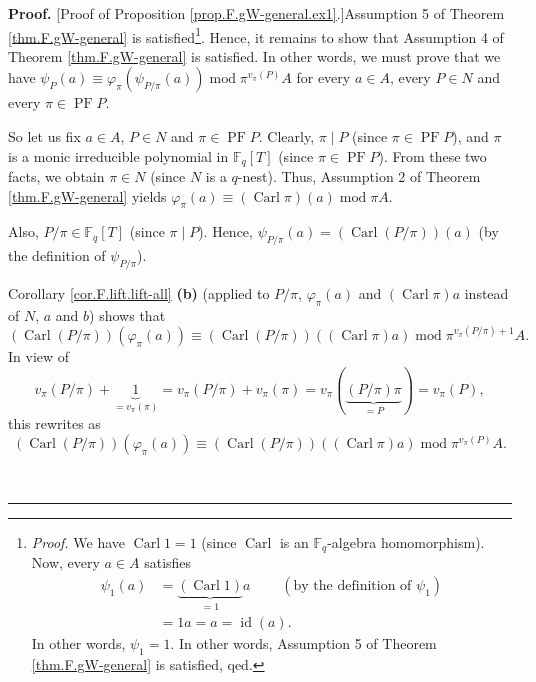 \documentclass[numbers=enddot,12pt,final,onecolumn,notitlepage]{scrartcl}%
\theoremstyle{definition}
\newenvironment{proof}[1][Proof]{\noindent\textbf{#1.} }{\ \rule{0.5em}{0.5em}}
\begin{document}
\begin{proof}
[Proof of Proposition \ref{prop.F.gW-general.ex1}.]Assumption 5 of Theorem
\ref{thm.F.gW-general} is satisfied\footnote{\textit{Proof.} We have
$\operatorname*{Carl}1=1$ (since $\operatorname*{Carl}$ is an $\mathbb{F}_{q}%
$-algebra homomorphism). Now, every $a\in A$ satisfies
\begin{align*}
\psi_{1}\left(  a\right)   &  =\underbrace{\left(  \operatorname*{Carl}%
1\right)  }_{=1}a\ \ \ \ \ \ \ \ \ \ \left(  \text{by the definition of }%
\psi_{1}\right) \\
&  =1a=a=\operatorname*{id}\left(  a\right)  .
\end{align*}
In other words, $\psi_{1}=1$. In other words, Assumption 5 of Theorem
\ref{thm.F.gW-general} is satisfied, qed.}. Hence, it remains to show that
Assumption 4 of Theorem \ref{thm.F.gW-general} is satisfied. In other words,
we must prove that we have $\psi_{P}\left(  a\right)  \equiv\varphi_{\pi
}\left(  \psi_{P/\pi}\left(  a\right)  \right)  \operatorname{mod}\pi^{v_{\pi
}\left(  P\right)  }A$ for every $a\in A$, every $P\in N$ and every $\pi
\in\operatorname*{PF}P$.

So let us fix $a\in A$, $P\in N$ and $\pi\in\operatorname*{PF}P$. Clearly,
$\pi\mid P$ (since $\pi\in\operatorname*{PF}P$), and $\pi$ is a monic
irreducible polynomial in $\mathbb{F}_{q}\left[  T\right]  $ (since $\pi
\in\operatorname*{PF}P$). From these two facts, we obtain $\pi\in N$ (since
$N$ is a $q$-nest). Thus, Assumption 2 of Theorem \ref{thm.F.gW-general}
yields $\varphi_{\pi}\left(  a\right)  \equiv\left(  \operatorname*{Carl}%
\pi\right)  \left(  a\right)  \operatorname{mod}\pi A$.

Also, $P/\pi\in\mathbb{F}_{q}\left[  T\right]  $ (since $\pi\mid P$). Hence,
$\psi_{P/\pi}\left(  a\right)  =\left(  \operatorname*{Carl}\left(
P/\pi\right)  \right)  \left(  a\right)  $ (by the definition of $\psi_{P/\pi
}$).

Corollary \ref{cor.F.lift.lift-all} \textbf{(b)} (applied to $P/\pi$,
$\varphi_{\pi}\left(  a\right)  $ and $\left(  \operatorname*{Carl}\pi\right)
a$ instead of $N$, $a$ and $b$) shows that%
\[
\left(  \operatorname*{Carl}\left(  P/\pi\right)  \right)  \left(
\varphi_{\pi}\left(  a\right)  \right)  \equiv\left(  \operatorname*{Carl}%
\left(  P/\pi\right)  \right)  \left(  \left(  \operatorname*{Carl}\pi\right)
a\right)  \operatorname{mod}\pi^{v_{\pi}\left(  P/\pi\right)  +1}A.
\]
In view of
\[
v_{\pi}\left(  P/\pi\right)  +\underbrace{1}_{=v_{\pi}\left(  \pi\right)
}=v_{\pi}\left(  P/\pi\right)  +v_{\pi}\left(  \pi\right)  =v_{\pi}\left(
\underbrace{\left(  P/\pi\right)  \pi}_{=P}\right)  =v_{\pi}\left(  P\right)
,
\]
this rewrites as
\begin{equation}
\left(  \operatorname*{Carl}\left(  P/\pi\right)  \right)  \left(
\varphi_{\pi}\left(  a\right)  \right)  \equiv\left(  \operatorname*{Carl}%
\left(  P/\pi\right)  \right)  \left(  \left(  \operatorname*{Carl}\pi\right)
a\right)  \operatorname{mod}\pi^{v_{\pi}\left(  P\right)  }A.
\label{pf.prop.F.gW-general.ex1.a1}%
\end{equation}



\end{proof}
\end{document}
